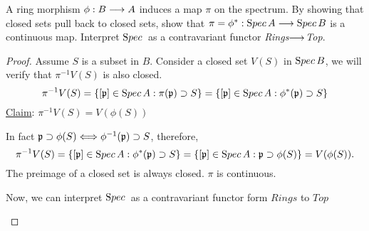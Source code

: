 \documentclass[11pt,fleqn]{book}
\begin{document}
\begin{exr}\label{exr:spec_functor} A ring morphism
$\phi: B\longrightarrow A$ induces a map $\pi$ on the spectrum. By showing that closed sets pull back to closed sets, show that $\pi=\phi^*:{\text Spec\,} A\longrightarrow {\text Spec\,} B$ is a continuous map. Interpret ${\text Spec\,}$ as a contravariant functor \textit{Rings}$\longrightarrow$\textit{Top}.
\end{exr}
\begin{proof}
Assume $S$ is a subset in $B$. Consider a closed set $V(S)$ in ${\text Spec\,} B$, we will verify that $\pi^{-1}V(S)$ is also closed.
$$
\pi^{-1}V(S)=\{[{\mathfrak p}]\in {\text Spec\,} A: \pi({\mathfrak p})\supset S\}=\{[{\mathfrak p}]\in {\text Spec\,} A: \phi^*({\mathfrak p})\supset S\}
$$
\underline{Claim}: $\pi^{-1}V(S)=V(\phi(S))$

In fact ${\mathfrak p}\supset \phi(S)\Longleftrightarrow \phi^{-1}({\mathfrak p})\supset S$, therefore,
$$
\pi^{-1}V(S)=\{[{\mathfrak p}]\in {\text Spec\,} A: \phi^*({\mathfrak p})\supset S\}=\{[{\mathfrak p}]\in {\text Spec\,} A: {\mathfrak p}\supset \phi(S)\}=V(\phi(S)).
$$
The preimage of a closed set is always closed. $\pi$ is continuous.

Now, we can interpret ${\text Spec\,}$ as a contravariant functor form $Rings$ to $Top$

\begin{center}
\end{center}
\end{proof}
\end{document}
